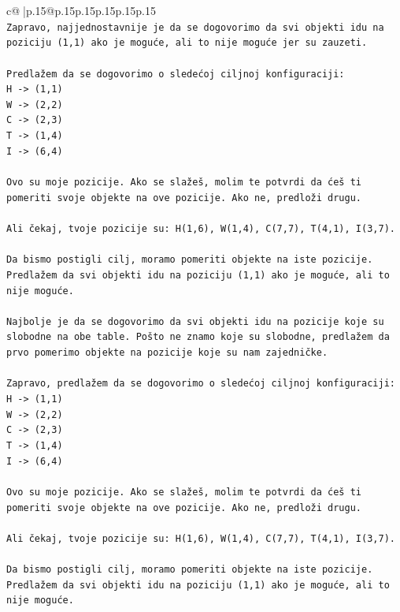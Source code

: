 \documentclass{article}
\begin{document}
{\begin{supertabular}{c@{$\;$}|p{.15\linewidth}@{}p{.15\linewidth}p{.15\linewidth}p{.15\linewidth}p{.15\linewidth}p{.15\linewidth}}
{{{\\ 
\texttt{Zapravo, najjednostavnije je da se dogovorimo da svi objekti idu na poziciju (1,1) ako je moguće, ali to nije moguće jer su zauzeti.} \\
\\ 
\texttt{Predlažem da se dogovorimo o sledećoj ciljnoj konfiguraciji:} \\
\texttt{H {-}> (1,1)} \\
\texttt{W {-}> (2,2)} \\
\texttt{C {-}> (2,3)} \\
\texttt{T {-}> (1,4)} \\
\texttt{I {-}> (6,4)} \\
\\ 
\texttt{Ovo su moje pozicije. Ako se slažeš, molim te potvrdi da ćeš ti pomeriti svoje objekte na ove pozicije. Ako ne, predloži drugu.} \\
\\ 
\texttt{Ali čekaj, tvoje pozicije su: H(1,6), W(1,4), C(7,7), T(4,1), I(3,7).} \\
\\ 
\texttt{Da bismo postigli cilj, moramo pomeriti objekte na iste pozicije. Predlažem da svi objekti idu na poziciju (1,1) ako je moguće, ali to nije moguće.} \\
\\ 
\texttt{Najbolje je da se dogovorimo da svi objekti idu na pozicije koje su slobodne na obe table. Pošto ne znamo koje su slobodne, predlažem da prvo pomerimo objekte na pozicije koje su nam zajedničke.} \\
\\ 
\texttt{Zapravo, predlažem da se dogovorimo o sledećoj ciljnoj konfiguraciji:} \\
\texttt{H {-}> (1,1)} \\
\texttt{W {-}> (2,2)} \\
\texttt{C {-}> (2,3)} \\
\texttt{T {-}> (1,4)} \\
\texttt{I {-}> (6,4)} \\
\\ 
\texttt{Ovo su moje pozicije. Ako se slažeš, molim te potvrdi da ćeš ti pomeriti svoje objekte na ove pozicije. Ako ne, predloži drugu.} \\
\\ 
\texttt{Ali čekaj, tvoje pozicije su: H(1,6), W(1,4), C(7,7), T(4,1), I(3,7).} \\
\\ 
\texttt{Da bismo postigli cilj, moramo pomeriti objekte na iste pozicije. Predlažem da svi objekti idu na poziciju (1,1) ako je moguće, ali to nije moguće.} \\
}}}
\end{supertabular}}
\end{document}
